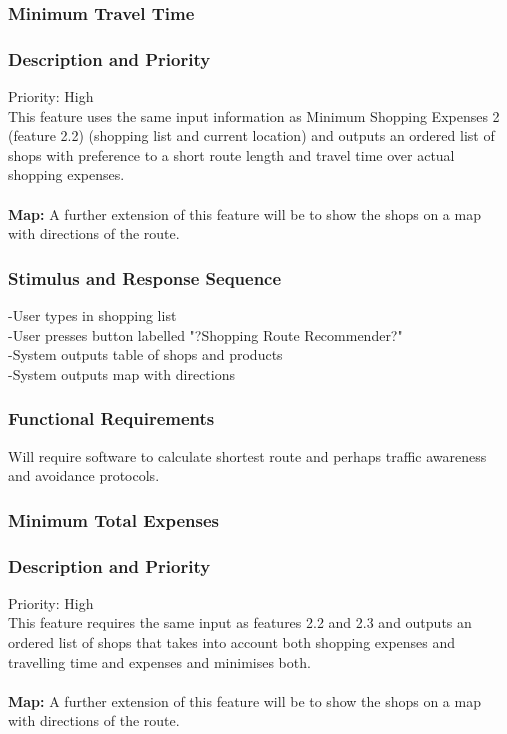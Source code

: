 \documentclass[12pt]{article}
\begin{document}
 \subsubsection{Minimum Travel Time}
\subsubsection*{Description and Priority}
 Priority: High\\
 This feature uses the same input information as Minimum Shopping Expenses 2 (feature 2.2) (shopping list and current location) and outputs an ordered list of shops with preference to a short route length and travel time over actual shopping expenses.  
\\\\
\textbf{Map:} A further extension of this feature will be to show the shops on a map with directions of the route.
 \subsubsection*{Stimulus and Response Sequence}
-User types in shopping list\\
-User presses button labelled "?Shopping Route Recommender?"\\
-System outputs table of shops and products\\
-System outputs map with directions\\ 
\subsubsection*{Functional Requirements}
Will require software to calculate shortest route and perhaps traffic awareness and avoidance  protocols.
 
 \subsubsection{Minimum Total Expenses}
\subsubsection*{Description and Priority}
 Priority: High\\
 This feature requires the same input as features 2.2 and 2.3 and outputs an ordered list of shops that takes into account both shopping expenses and travelling time and expenses and minimises both. 
 \\\\
\textbf{Map:} A further extension of this feature will be to show the shops on a map with directions of the route.
\end{document}
